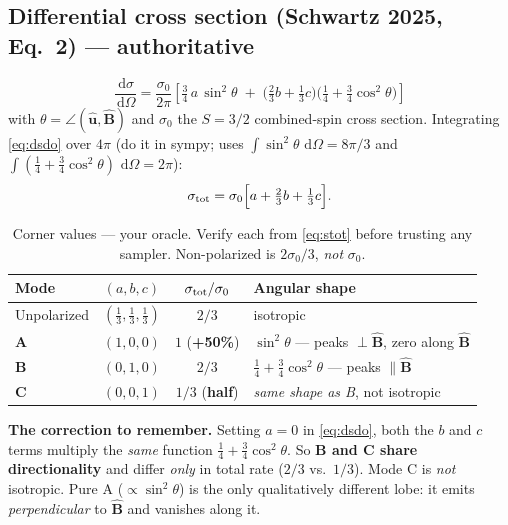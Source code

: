 \documentclass[11pt]{article}
\newcommand{\Bhat}{\hat{\mathbf{B}}}
\newcommand{\uu}{\hat{\mathbf{u}}}
\newcommand{\dd}{\,\mathrm{d}}
\begin{document}
\subsection{Differential cross section (Schwartz 2025, Eq.~2) --- authoritative}
\begin{equation}
\boxed{\;\frac{\dd\sigma}{\dd\Omega} = \frac{\sigma_0}{2\pi}\left[\tfrac34\,a\,\sin^2\theta
 \;+\; \Big(\tfrac23 b + \tfrac13 c\Big)\Big(\tfrac14 + \tfrac34\cos^2\theta\Big)\right]\;}
\label{eq:dsdo}
\end{equation}
with $\theta=\angle(\uu,\Bhat)$ and $\sigma_0$ the $S=3/2$ combined-spin cross section.
Integrating \eqref{eq:dsdo} over $4\pi$ (do it in sympy; uses
$\int\sin^2\theta\,\dd\Omega=8\pi/3$ and $\int(\tfrac14+\tfrac34\cos^2\theta)\,\dd\Omega=2\pi$):
\begin{equation}
\sigma_{\rm tot} = \sigma_0\Big[a + \tfrac23 b + \tfrac13 c\Big].
\label{eq:stot}
\end{equation}

\begin{table}[h]\centering
\begin{tabular}{lccl}
\toprule
Mode & $(a,b,c)$ & $\sigma_{\rm tot}/\sigma_0$ & Angular shape \\
\midrule
Unpolarized & $(\tfrac13,\tfrac13,\tfrac13)$ & $2/3$ & isotropic \\
\textbf{A} & $(1,0,0)$ & $1$ (\textbf{+50\%}) & $\sin^2\theta$ --- peaks $\perp\Bhat$, zero along $\Bhat$ \\
\textbf{B} & $(0,1,0)$ & $2/3$ & $\tfrac14+\tfrac34\cos^2\theta$ --- peaks $\parallel\Bhat$ \\
\textbf{C} & $(0,0,1)$ & $1/3$ (\textbf{half}) & \emph{same shape as B}, not isotropic \\
\bottomrule
\end{tabular}
\caption{Corner values --- your oracle. Verify each from \eqref{eq:stot} before trusting any
sampler. Non-polarized is $2\sigma_0/3$, \emph{not} $\sigma_0$.}
\end{table}

\begin{key}
\textbf{The correction to remember.} Setting $a=0$ in \eqref{eq:dsdo}, both the $b$ and $c$ terms
multiply the \emph{same} function $\tfrac14+\tfrac34\cos^2\theta$. So \textbf{B and C share
directionality} and differ \emph{only} in total rate ($2/3$ vs.\ $1/3$). Mode C is \emph{not}
isotropic. Pure A ($\propto\sin^2\theta$) is the only qualitatively different lobe: it emits
\emph{perpendicular} to $\Bhat$ and vanishes along it.
\end{key}
\end{document}
